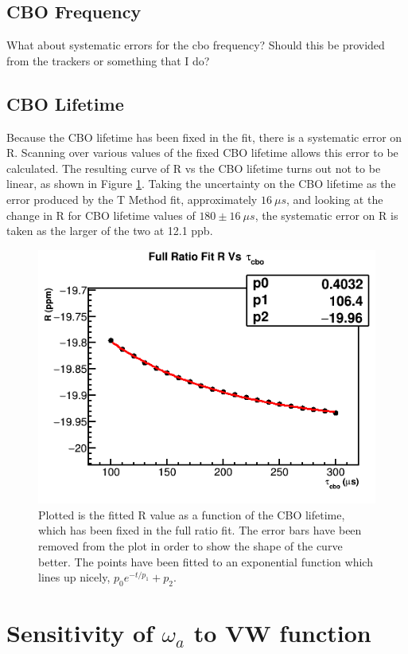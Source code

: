 	\subsection{CBO Frequency}

		What about systematic errors for the cbo frequency? Should this be provided from the trackers or something that I do?

	\subsection{CBO Lifetime}

		Because the CBO lifetime has been fixed in the fit, there is a systematic error on R. Scanning over various values of the fixed CBO lifetime allows this error to be calculated. The resulting curve of R vs the CBO lifetime turns out not to be linear, as shown in Figure \ref{fig:CBOLifetime}. Taking the uncertainty on the CBO lifetime as the error produced by the T Method fit, approximately $\SI{16}{\mu s}$, and looking at the change in R for CBO lifetime values of $180 \pm \SI{16}{\mu s}$, the systematic error on R is taken as the larger of the two at 12.1 ppb.

		\begin{figure}[]
			\centering
			\includegraphics[width=.6\textwidth]{RatioCBO_R_Vs_tau_cbo_Canv}
		    \caption[CBOLifetime]{Plotted is the fitted R value as a function of the CBO lifetime, which has been fixed in the full ratio fit. The error bars have been removed from the plot in order to show the shape of the curve better. The points have been fitted to an exponential function which lines up nicely, $p_{0} e^{-t/p_{1}} + p_{2}$.}
		    \label{fig:CBOLifetime}
		\end{figure}





\section{Sensitivity of \texorpdfstring{$\omega_{a}$}{} to VW function}

